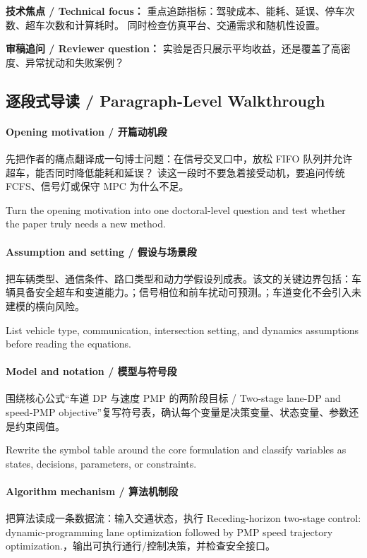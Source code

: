 \documentclass[UTF8,a4paper,11pt,fontset=fandol]{ctexart}
\begin{document}
\textbf{技术焦点 / Technical focus：} 重点追踪指标：驾驶成本、能耗、延误、停车次数、超车次数和计算耗时。 同时检查仿真平台、交通需求和随机性设置。

\textbf{审稿追问 / Reviewer question：} 实验是否只展示平均收益，还是覆盖了高密度、异常扰动和失败案例？


\subsection{逐段式导读 / Paragraph-Level Walkthrough}
\paragraph{Opening motivation / 开篇动机段}先把作者的痛点翻译成一句博士问题：在信号交叉口中，放松 FIFO 队列并允许超车，能否同时降低能耗和延误？ 读这一段时不要急着接受动机，要追问传统 FCFS、信号灯或保守 MPC 为什么不足。

Turn the opening motivation into one doctoral-level question and test whether the paper truly needs a new method.

\paragraph{Assumption and setting / 假设与场景段}把车辆类型、通信条件、路口类型和动力学假设列成表。该文的关键边界包括：车辆具备安全超车和变道能力。；信号相位和前车扰动可预测。；车道变化不会引入未建模的横向风险。

List vehicle type, communication, intersection setting, and dynamics assumptions before reading the equations.

\paragraph{Model and notation / 模型与符号段}围绕核心公式“车道 DP 与速度 PMP 的两阶段目标 / Two-stage lane-DP and speed-PMP objective”复写符号表，确认每个变量是决策变量、状态变量、参数还是约束阈值。

Rewrite the symbol table around the core formulation and classify variables as states, decisions, parameters, or constraints.

\paragraph{Algorithm mechanism / 算法机制段}把算法读成一条数据流：输入交通状态，执行 Receding-horizon two-stage control: dynamic-programming lane optimization followed by PMP speed trajectory optimization.，输出可执行通行/控制决策，并检查安全接口。
\end{document}
